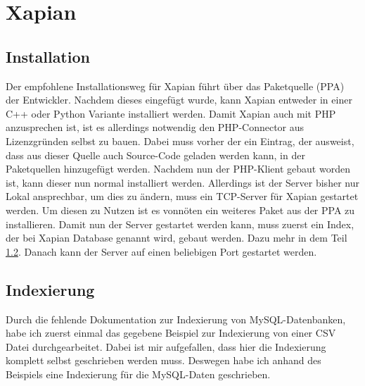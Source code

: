 
\section{Xapian}

\subsection{Installation}

Der empfohlene Installationsweg für Xapian führt über das Paketquelle (PPA) der Entwickler. Nachdem dieses eingefügt wurde, kann Xapian entweder in einer C++ oder Python Variante installiert werden. Damit Xapian auch mit PHP anzusprechen ist, ist es allerdings notwendig den PHP-Connector aus Lizenzgründen selbst zu bauen. Dabei muss vorher der ein Eintrag, der ausweist, dass aus dieser Quelle auch Source-Code geladen werden kann, in der Paketquellen hinzugefügt werden. Nachdem nun der PHP-Klient gebaut worden ist, kann dieser nun normal installiert werden.
Allerdings ist der Server bisher nur Lokal ansprechbar, um dies zu ändern, muss ein TCP-Server für Xapian gestartet werden. Um diesen zu Nutzen ist es vonnöten ein weiteres Paket aus der PPA zu installieren. Damit nun der Server gestartet werden kann, muss zuerst ein Index, der bei Xapian Database genannt wird, gebaut werden. Dazu mehr in dem Teil \ref{xap:index}. Danach kann der Server auf einen beliebigen Port gestartet werden.

\subsection{Indexierung}
\label{xap:index}

Durch die fehlende Dokumentation zur Indexierung von MySQL-Datenbanken, habe ich zuerst einmal das gegebene Beispiel zur Indexierung von einer CSV Datei durchgearbeitet. Dabei ist mir aufgefallen, dass hier die Indexierung komplett selbst geschrieben werden muss. Deswegen habe ich anhand des Beispiels eine Indexierung für die MySQL-Daten geschrieben. 

